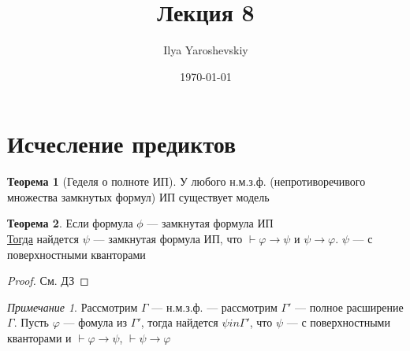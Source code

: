 \documentclass[english]{article}
\author{Ilya Yaroshevskiy}
\date{\today}
\title{Лекция 8}
\theoremstyle{plain}
\theoremstyle{remark}
\newtheorem*{remark}{Примечание}
\theoremstyle{definition}
\newtheorem{theorem}{Теорема}[section]
\begin{document}
\maketitle
\tableofcontents


\section{Исчесление предиктов}
\label{sec:orgf3ef73a}
\begin{theorem}[Геделя о полноте ИП]
У любого н.м.з.ф. (непротиворечивого множества замкнутых формул) ИП существует модель
\end{theorem}
\begin{theorem}
Если формула \(\phi\) --- замкнутая формула ИП \\
\uline{Тогда} найдется \(\psi\) --- замкнутая формула ИП, что \(\vdash \varphi \to \psi\) и \(\psi \to \varphi\). \(\psi\) --- с поверхностными кванторами
\end{theorem}
\begin{proof}
См. ДЗ
\end{proof}
\begin{remark}
Рассмотрим \(\Gamma\) --- н.м.з.ф. --- рассмотрим \(\Gamma'\) --- полное расширение \(\Gamma\). Пусть \(\varphi\) --- фомула из \(\Gamma'\), тогда найдется \(\psi in \Gamma'\), что \(\psi\) --- с поверхностными кванторами и \(\vdash \varphi \to \psi\), \(\vdash \psi \to \varphi\)
\end{remark}
\end{document}
